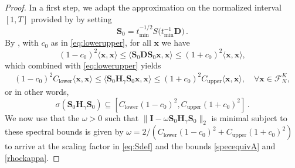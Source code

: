\documentclass[a4paper,11pt,oneside]{amsart}
\providecommand{\norm}[1]{\lVert#1\rVert}
\theoremstyle{definition}
\theoremstyle{remark}
\newcommand{\cF}{{\mathcal{F}}}
\newcommand{\ten}[1]{\boldsymbol{#1}}
\numberwithin{equation}{section}
\numberwithin{theorem}{section}
\begin{document}
\begin{proof}
In a first step, we adapt the approximation on the normalized interval $[1,T]$ provided by  by setting
\[
 \ten S_0 = t_{\min}^{-1/2}  S \bigl( t_{\min}^{-1} \ten D \bigr)  \,.
\]
By , with $c_0$ as in \eqref{eq:lowerupper}, for all $\ten x$ we have
\[   (1-c_0)^2 \langle   \ten x,  \ten x \rangle
   \leq \langle   \ten S_0  \ten D  \ten S_0 \ten x , \ten x \rangle 	
   \leq    (1 + c_0)^2 \langle  \ten x,  \ten x \rangle,
\]
which combined with \eqref{eq:lowerupper} yields
\begin{align*}
  (1-c_0)^2 C_{\mathrm{lower}} \langle   \ten x,  \ten x \rangle
   \leq \langle \ten S_0 \ten H_\gamma \ten S_0  \ten x , \ten x \rangle 	\leq 
   (1+c_0)^2 C_{\mathrm{upper}} \langle  \ten x,  \ten x \rangle, \quad \forall \ten x \in \cF^K_N,
\end{align*}
or in other words,
\[
  \sigma(\ten S_0 \ten H_\gamma  \ten S_0)\subseteq [  C_{\mathrm{lower}}(1-c_0)^2,   C_{\mathrm{upper}}(1+c_0)^2 ] \,.
\] 
We now use that the $\omega > 0$ such that $\norm{ \ten I - \omega \ten S_0 \ten H_\gamma \ten S_0 }_2$ is minimal subject to these spectral bounds is given by 
$ \omega = 2 / (C_{\mathrm{lower}}(1-c_0)^2 +  C_{\mathrm{upper}}(1+c_0)^2) $ to arrive at the scaling factor in \eqref{eq:Sdef} and the bounds \eqref{specequivA} and \eqref{rhockappa}.
\end{proof}
\end{document}
